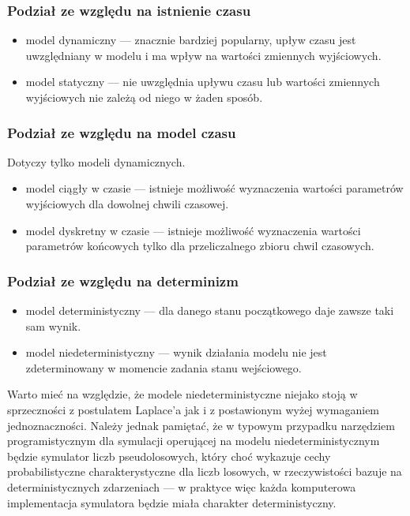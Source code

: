 \subsubsection{Podział ze względu na istnienie czasu}
\par{
\begin{itemize}
\item model dynamiczny --- znacznie bardziej popularny, upływ czasu jest uwzględniany w modelu i ma wpływ na wartości zmiennych wyjściowych.
\item model statyczny --- nie uwzględnia upływu czasu lub wartości zmiennych wyjściowych nie zależą od niego w żaden sposób.
\end{itemize}
}

\subsubsection{Podział ze względu na model czasu}
\par{
Dotyczy tylko modeli dynamicznych.
\begin{itemize}
\item model ciągły w czasie --- istnieje możliwość wyznaczenia wartości parametrów wyjściowych dla dowolnej chwili czasowej.
\item model dyskretny w czasie --- istnieje możliwość wyznaczenia wartości parametrów końcowych tylko dla przeliczalnego zbioru chwil czasowych.
\end{itemize}
}

\subsubsection{Podział ze względu na determinizm}
\par{
\begin{itemize}
\item model deterministyczny --- dla danego stanu początkowego daje zawsze taki sam wynik.
\item model niedeterministyczny --- wynik działania modelu nie jest zdeterminowany w momencie zadania stanu wejściowego.
\end{itemize}
}
\par{
Warto mieć na względzie, że modele niedeterministyczne niejako stoją w sprzeczności z postulatem Laplace'a jak i z postawionym wyżej wymaganiem jednoznaczności. Należy jednak pamiętać, że w typowym przypadku narzędziem programistycznym dla symulacji operującej na modelu niedeterministycznym będzie symulator liczb pseudolosowych, który choć wykazuje cechy probabilistyczne charakterystyczne dla liczb losowych, w rzeczywistości bazuje na deterministycznych zdarzeniach --- w praktyce więc każda komputerowa implementacja symulatora będzie miała charakter deterministyczny.
}

